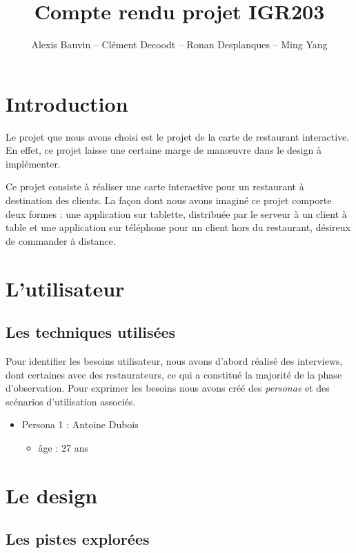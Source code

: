 \documentclass[a4paper,12pt]{article}
\title{Compte rendu projet IGR203}
\author{Alexis Bauvin -- Clément Decoodt -- Ronan Desplanques -- Ming Yang}
\begin{document}
\maketitle

\tableofcontents

\section*{Introduction}

Le projet que nous avons choisi est le projet de la carte de restaurant interactive. En effet, ce projet laisse une
certaine marge de manœuvre dans le design à implémenter.

Ce projet consiste à réaliser une carte interactive pour un restaurant à destination des clients. La façon dont nous
avons imaginé ce projet comporte deux formes : une application sur tablette, distribuée par le serveur à un client à
table et une application sur téléphone pour un client hors du restaurant, désireux de commander à distance.

\newpage

\section{L'utilisateur}

\subsection{Les techniques utilisées}

Pour identifier les besoins utilisateur, nous avons d'abord réalisé des interviews, dont certaines avec des restaurateurs, ce qui a constitué la majorité de la phase d'observation. Pour exprimer les besoins nous avons créé des \textit{personae} et des scénarios d'utilisation associés.

\begin{itemize}
\item Persona 1 : Antoine Dubois

\begin{itemize}
\item âge : 27 ans
\end{itemize}
\end{itemize}

\section{Le design}

\subsection{Les pistes explorées}
\end{document}
